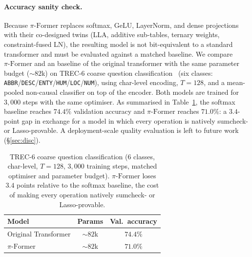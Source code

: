 \documentclass[letterpaper,twocolumn,10pt]{article}
\theoremstyle{remark}
\theoremstyle{definition}
\newcommand{\sys}{\ensuremath{\pi\text{-Former}}}
\begin{document}

\paragraph{Accuracy sanity check.}
Because \sys{} replaces softmax, GeLU, LayerNorm, and dense
projections with their co-designed twins (LLA, additive sub-tables,
ternary weights, constraint-fused LN), the resulting model is not
bit-equivalent to a standard transformer and must be evaluated
against a matched baseline. We compare \sys{} and an baseline of the original transformer 
with the same parameter budget ($\sim\!82$k) on TREC-6 coarse question
classification~\cite{li2002trec} (six classes:
\texttt{ABBR}/\texttt{DESC}/\texttt{ENTY}/\texttt{HUM}/\texttt{LOC}/\texttt{NUM}),
using char-level encoding, $T\!=\!128$, and a mean-pooled non-causal
classifier on top of the encoder. Both models are trained for
$3{,}000$ steps with the same optimiser. As summarised in
Table~\ref{tab:eval-acc}, the softmax baseline reaches $74.4\%$
validation accuracy and \sys{} reaches $71.0\%$: a $3.4$-point gap
in exchange for a model in which every operation is natively
sumcheck- or Lasso-provable. A deployment-scale quality evaluation
is left to future work (\S\ref{sec:disc}).

\begin{table}[t]
\centering
\footnotesize
\begin{tabular}{@{}lcc@{}}
\toprule
\textbf{Model} & \textbf{Params} & \textbf{Val.\ accuracy} \\
\midrule
Original Transformer & $\sim\!82$k & $74.4\%$ \\
\sys{}               & $\sim\!82$k & $71.0\%$ \\
\bottomrule
\end{tabular}
\caption{TREC-6 coarse question classification (6 classes,
char-level, $T\!=\!128$, $3{,}000$ training steps, matched optimiser
and parameter budget). \sys{} loses $3.4$ points relative to the
softmax baseline, the cost of making every operation natively
sumcheck- or Lasso-provable.}
\label{tab:eval-acc}
\end{table}
\end{document}
